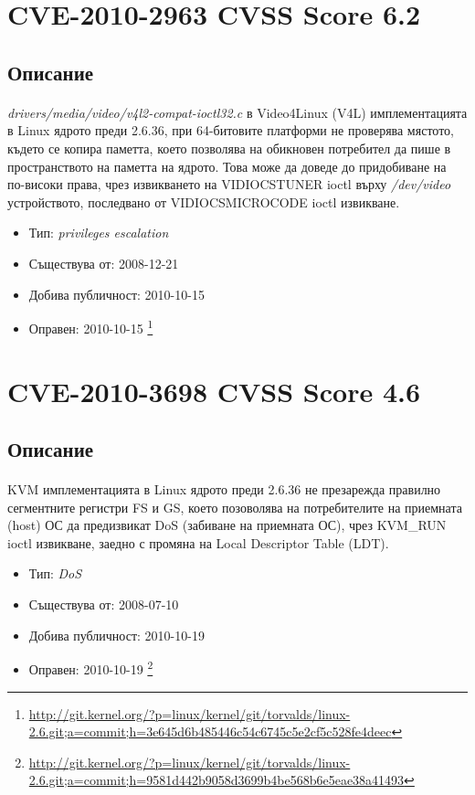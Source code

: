 \documentclass[a4paper,12pt,leqno]{article}
\begin{document}
\section{CVE-2010-2963 CVSS Score 6.2}
\subsection{Описание}
\paragraph{}
\textit{drivers/media/video/v4l2-compat-ioctl32.c} в Video4Linux (V4L) имплементацията в Linux ядрото преди 2.6.36, при 64-битовите платформи не проверява мястото, където се копира паметта, което позволява на обикновен потребител да пише в пространството на паметта на ядрото. Това може да доведе до придобиване на по-високи права, чрез извикването на VIDIOCSTUNER ioctl върху \textit{/dev/video} устройството, последвано от VIDIOCSMICROCODE ioctl извикване.

\begin{itemize}
    \item Тип: \textit{privileges escalation}
    \item Съществува от: 2008-12-21
  	\item Добива публичност: 2010-10-15
    \item Оправен: 2010-10-15 \footnote{\url{http://git.kernel.org/?p=linux/kernel/git/torvalds/linux-2.6.git;a=commit;h=3e645d6b485446c54c6745c5e2cf5c528fe4deec}}
\end{itemize}



\section{CVE-2010-3698 CVSS Score 4.6}
\subsection{Описание}
\paragraph{}
KVM имплементацията в Linux ядрото преди 2.6.36 не презарежда правилно сегментните регистри FS и GS, което позоволява на потребителите на приемната (host) ОС да предизвикат DoS (забиване на приемната ОС), чрез KVM\_RUN ioctl извикване, заедно с промяна на Local Descriptor Table (LDT).

\begin{itemize}
    \item Тип: \textit{DoS}
    \item Съществува от: 2008-07-10
  	\item Добива публичност: 2010-10-19
    \item Оправен: 2010-10-19 \footnote{\url{http://git.kernel.org/?p=linux/kernel/git/torvalds/linux-2.6.git;a=commit;h=9581d442b9058d3699b4be568b6e5eae38a41493}}
\end{itemize}
\end{document}
